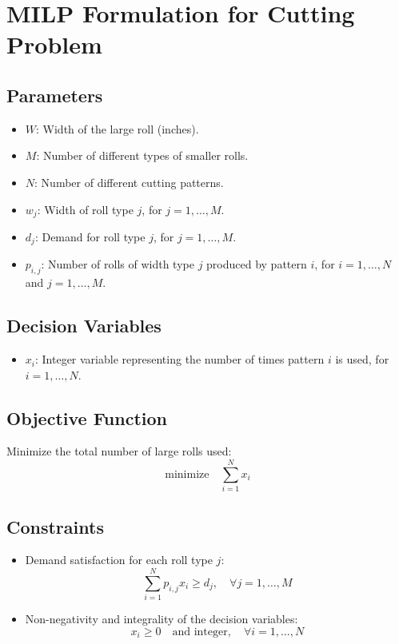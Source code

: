 \documentclass{article}
\begin{document}
\section*{MILP Formulation for Cutting Problem}

\subsection*{Parameters}
\begin{itemize}
    \item $W$: Width of the large roll (inches).
    \item $M$: Number of different types of smaller rolls.
    \item $N$: Number of different cutting patterns.
    \item $w_j$: Width of roll type $j$, for $j = 1, \dots, M$.
    \item $d_j$: Demand for roll type $j$, for $j = 1, \dots, M$.
    \item $p_{i,j}$: Number of rolls of width type $j$ produced by pattern $i$, for $i = 1, \dots, N$ and $j = 1, \dots, M$.
\end{itemize}

\subsection*{Decision Variables}
\begin{itemize}
    \item $x_i$: Integer variable representing the number of times pattern $i$ is used, for $i = 1, \dots, N$.
\end{itemize}

\subsection*{Objective Function}
Minimize the total number of large rolls used:
\[
\text{minimize} \quad \sum_{i=1}^{N} x_i
\]

\subsection*{Constraints}
\begin{itemize}
    \item Demand satisfaction for each roll type $j$:
    \[
    \sum_{i=1}^{N} p_{i,j} x_i \geq d_j, \quad \forall j = 1, \dots, M
    \]
    \item Non-negativity and integrality of the decision variables:
    \[
    x_i \geq 0 \quad \text{and integer}, \quad \forall i = 1, \dots, N
    \]
\end{itemize}
\end{document}
